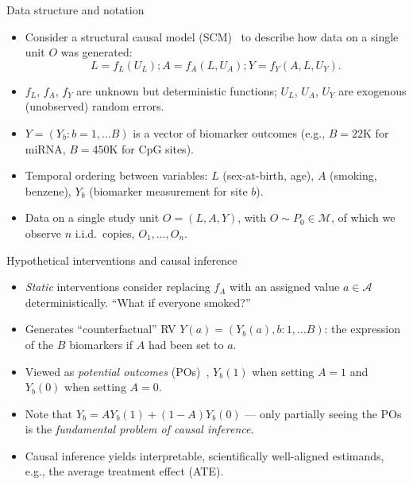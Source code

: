 \documentclass{beamer}
\begin{document}
\begin{frame}[c]{Data structure and notation}
\begin{center}
\begin{itemize}
  \itemsep6pt
  \item Consider a structural causal model (SCM)~\citep{pearl2000causality} to
    describe how data on a single unit $O$ was generated:
    \begin{equation*}\label{npsem}
        L = f_L(U_L); A = f_A(L, U_A); Y = f_Y(A, L, U_Y).
      \end{equation*}
  \item $f_L$, $f_A$, $f_Y$ are unknown but deterministic functions; $U_L$,
    $U_A$, $U_Y$ are exogenous (unobserved) random errors.
  \item $Y = (Y_b: b = 1, \ldots B)$ is a vector of biomarker outcomes (e.g.,
    $B = 22$K for miRNA, $B = 450$K for CpG sites).
  \item Temporal ordering between variables: $L$ (sex-at-birth, age), $A$
    (smoking, benzene), $Y_b$ (biomarker measurement for site $b$).
  \item Data on a single study unit $O = (L, A, Y)$, with $O \sim P_0 \in
    \mathcal{M}$, of which we observe $n$ i.i.d.~copies, $O_1, \ldots, O_n$.
\end{itemize}
\end{center}

\note{
}
\end{frame}


\begin{frame}[c]{Hypothetical interventions and causal inference}
\begin{center}
\begin{itemize}
  \itemsep6pt
  \item \textit{Static} interventions consider replacing $f_A$ with an assigned
    value $a \in \mathcal{A}$ deterministically. ``What if everyone smoked?''
  \item Generates ``counterfactual'' RV $Y(a) = (Y_b(a), b: 1, \ldots B)$: the
    expression of the $B$ biomarkers if $A$ had been set to $a$.
  \item Viewed as \textit{potential outcomes} (POs)~\citep{rubin2005causal},
    $Y_b(1)$ when setting $A=1$ and $Y_b(0)$ when setting $A = 0$.
  \item Note that $Y_b = A Y_b(1) + (1 - A) Y_b(0)$ --- only partially seeing
    the POs is the \textit{fundamental problem of causal inference}.
  \item Causal inference yields interpretable, scientifically well-aligned
    estimands, e.g., the average treatment effect (ATE).
\end{itemize}
\end{center}

\end{frame}
\end{document}
